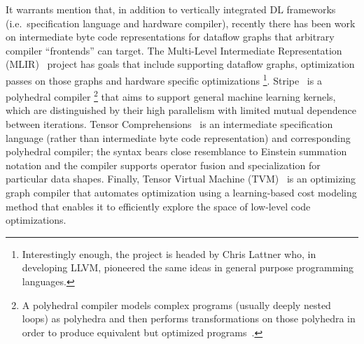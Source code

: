 It warrants mention that, in addition to vertically integrated DL frameworks (i.e.\ specification language and hardware compiler), recently there has been work on intermediate byte code representations for dataflow graphs that arbitrary compiler ``frontends'' can target.
The Multi-Level Intermediate Representation (MLIR)~\cite{lattner2020mlir} project has goals that include supporting dataflow graphs, optimization passes on those graphs and hardware specific optimizations%
\footnote{Interestingly enough, the project is headed by Chris Lattner who, in developing LLVM, pioneered the same ideas in general purpose programming languages.}.
Stripe~\cite{zerrell2019stripe} is a polyhedral compiler%
\footnote{A polyhedral compiler models complex programs (usually deeply nested loops) as polyhedra and then performs transformations on those polyhedra in order to produce equivalent but optimized programs~\cite{Griebl98codegeneration}.}
that aims to support general machine learning kernels, which are distinguished by their high parallelism with limited mutual dependence between iterations.
Tensor Comprehensions~\cite{vasilache2018tensor} is an intermediate specification language (rather than intermediate byte code representation) and corresponding polyhedral compiler;
the syntax bears close resemblance to Einstein summation notation and the compiler supports operator fusion and specialization for particular data shapes.
Finally, Tensor Virtual Machine (TVM)~\cite{10.5555/3291168.3291211} is an optimizing graph compiler that automates optimization using a learning-based cost modeling method that enables it to efficiently explore the space of low-level code optimizations.
